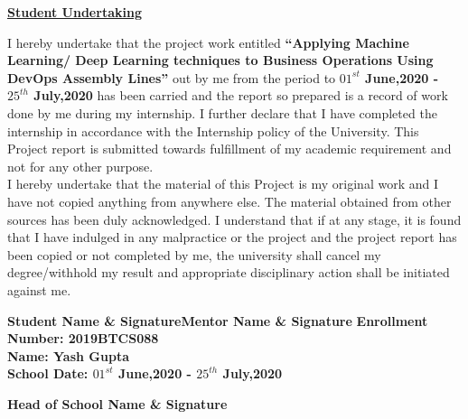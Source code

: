 \documentclass[12pt,oneside,a4paper]{report}
\begin{document}
\newpage
\begin{large}
\begin{center}
\fontsize{16pt}{10pt}\selectfont
\Large{\underline{\textbf{Student Undertaking}}}
\end{center}
\end{large}
\doublespacing
I hereby undertake that the project work entitled \textbf{ “Applying Machine Learning/ Deep Learning techniques to Business Operations Using DevOps Assembly Lines”} out by me from the period to \textbf{$01^{st}$ June,2020 - $25^{th}$ July,2020} has been carried and the report so prepared is a record of work done by me during my internship. I further declare that I have completed the
internship in accordance with the Internship policy of the University. This Project report is submitted towards fulfillment of my academic requirement and not for any other purpose.\vspace{5.0mm}\\I hereby undertake that the material of this Project is my original work and I have not copied anything from anywhere else. The material obtained from other sources has been duly acknowledged. I understand that if at any stage, it is found that I have indulged in any malpractice or the project and the project report has been copied or not completed by me, the university shall cancel my degree/withhold my result and appropriate disciplinary action shall be initiated against me.
\doublespacing

\begin{flushleft}
\vspace{1.0in}\textbf{Student Name \& Signature}\hspace{2.8in}\textbf{Mentor Name \& Signature}
\hspace{3.0in}\textbf{Enrollment Number: 2019BTCS088\\Name: Yash Gupta\\School Date: \textbf{$01^{st}$ June,2020 - $25^{th}$ July,2020}}\vspace{20mm}
\begin{flushright}
\textbf{ Head of School Name \& Signature}
\end{flushright}
\end{flushleft}
\end{document}
